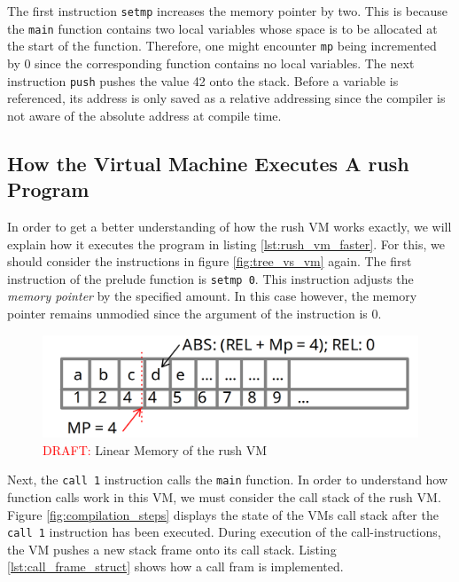 
The first instruction \texttt{setmp} increases the memory pointer by two.
This is because the \texttt{main} function contains two local variables whose space is to be allocated at the start of the function.
Therefore, one might encounter \texttt{mp} being incremented by 0 since the corresponding function contains no local variables.
The next instruction \texttt{push} pushes the value 42 onto the stack.
Before a variable is referenced, its address is only saved as a relative addressing since the compiler is not aware of the absolute address at compile time.

\subsection{How the Virtual Machine Executes A rush Program}

In order to get a better understanding of how the rush VM works exactly, we will explain how it executes the program in listing \ref{lst:rush_vm_faster}.
For this, we should consider the instructions in figure \ref{fig:tree_vs_vm} again.
The first instruction of the prelude function is \texttt{setmp 0}.
This instruction adjusts the \emph{memory pointer} by the specified amount.
In this case however, the memory pointer remains unmodied since the argument of the instruction is 0.


\begin{figure}[h]
	\includegraphics[width=\textwidth]{./vm_linmem_draft.png}
	\caption{\textcolor{red}{DRAFT:} Linear Memory of the rush VM}
	\label{fig:rush_vm_linmem}
\end{figure}

Next, the \texttt{call 1} instruction calls the \texttt{main} function.
In order to understand how function calls work in this VM, we must consider the call stack of the rush VM.
Figure \ref{fig:compilation_steps} displays the state of the VMs call stack after the \texttt{call 1} instruction has been executed.
During execution of the call-instructions, the VM pushes a new stack frame onto its call stack.
Listing \ref{lst:call_frame_struct} shows how a call fram is implemented.

